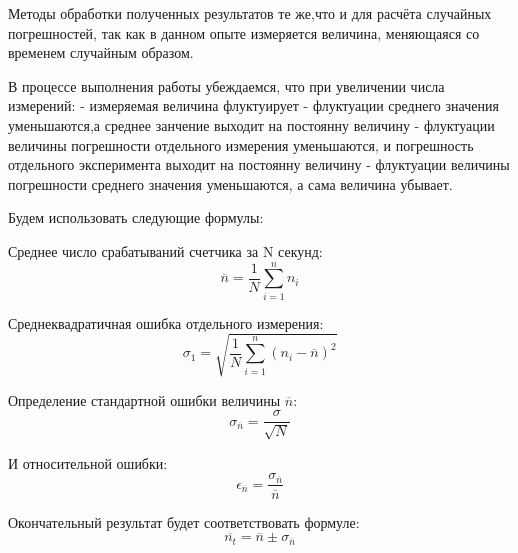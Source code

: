 Методы обработки полученных результатов те же,что и для расчёта случайных погрешностей, так как в данном опыте измеряется величина, меняющаяся со временем случайным образом.


В процессе выполнения работы убеждаемся, что при увеличении числа измерений:
-  измеряемая величина флуктуирует
-  флуктуации среднего значения уменьшаются,а среднее занчение выходит на постоянну величину
-  флуктуации величины погрешности отдельного измерения уменьшаются, и погрешность отдельного эксперимента выходит на постоянну величину
-  флуктуации величины погрешности среднего значения уменьшаются, а сама величина убывает.


Будем использовать следующие формулы:


Среднее число срабатываний счетчика за N секунд:
\begin{equation}
\overline{n} = \frac{1}{N}\sum\limits_{i=1}^n n_i
\end{equation}


Среднеквадратичная ошибка отдельного измерения:
\begin{equation}
\sigma_1 = \sqrt{\frac{1}{N}\sum\limits_{i=1}^n (n_i-\overline{n})^2}
\end{equation}


Определение стандартной ошибки величины $\overline{n}$:
\begin{equation}
\sigma_{\overline{n}} = \frac{\sigma}{\sqrt{N}}
\end{equation}


И относительной ошибки:
\begin{equation}
\epsilon_{\overline{n}} = \frac{\sigma_{\overline{n}}}{\overline{n}}
\end{equation}


Окончательный результат будет соответствовать формуле:
\begin{equation}
\overline{n_t} = \overline{n} \pm \sigma_{\overline{n}} 
\end{equation}


